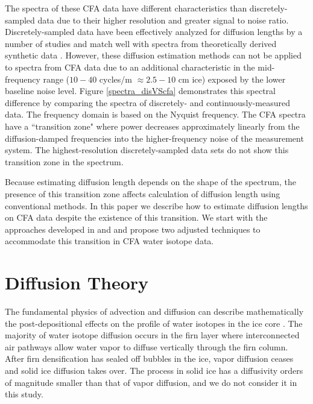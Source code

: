 \documentclass[draft, jgrga]{AGUTeX}
\begin{document}
\begin{article}
The spectra of these CFA data have different characteristics than discretely-sampled data due to their higher resolution and greater signal to noise ratio. Discretely-sampled data have been effectively analyzed for diffusion lengths by a number of studies \citep{Johnsen2000,Simonsen2011,Gkinis2014,vanderWel2015} and match well with spectra from theoretically derived synthetic data \citep{Holme2017}. However, these diffusion estimation methods can not be applied to spectra from CFA data due to an additional characteristic in the mid-frequency range ($10-40$ cycles/m $\approx 2.5-10$ cm ice) exposed by the lower baseline noise level. Figure \ref{spectra_disVScfa} demonstrates this spectral difference by comparing the spectra of discretely- and continuously-measured data. The frequency domain is based on the Nyquist frequency. The CFA spectra have a ``transition zone" where power decreases approximately linearly from the diffusion-damped frequencies into the higher-frequency noise of the measurement system. The highest-resolution discretely-sampled data sets do not show this transition zone in the spectrum.

Because estimating diffusion length depends on the shape of the spectrum, the presence of this transition zone affects calculation of diffusion length using conventional methods. In this paper we describe how to estimate diffusion lengths on CFA data despite the existence of this transition. We start with the approaches developed in \citet{Johnsen2000} and \citet{Gkinis2014} and propose two adjusted techniques to accommodate this transition in CFA water isotope data.


\section{Diffusion Theory}

The fundamental physics of advection and diffusion can describe mathematically the post-depositional effects on the profile of water isotopes in the ice core \citep{Johnsen1977}. The majority of water isotope diffusion occurs in the firn layer where interconnected air pathways allow water vapor to diffuse vertically through the firn column. After firn densification has sealed off bubbles in the ice, vapor diffusion ceases and solid ice diffusion takes over. The process in solid ice has a diffusivity orders of magnitude smaller than that of vapor diffusion, and we do not consider it in this study.


\end{article}
\end{document}
